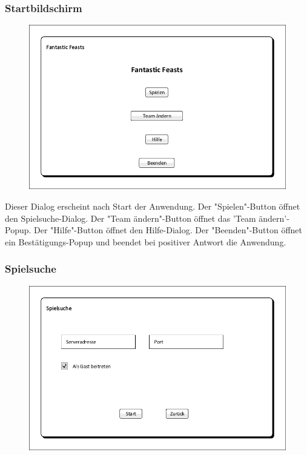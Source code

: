 \subsubsection{Startbildschirm}
\begin{figure}[H]
	\centering
	\includegraphics[scale=0.8]{images/Startbildschirm.pdf}
\end{figure}

Dieser Dialog erscheint nach Start der Anwendung. Der "Spielen"-Button öffnet den Spielsuche-Dialog. Der "Team ändern"-Button öffnet das 'Team ändern'-Popup. Der "Hilfe"-Button öffnet den Hilfe-Dialog. Der "Beenden"-Button öffnet ein Bestätigungs-Popup und beendet bei positiver Antwort die Anwendung.

\subsubsection{Spielsuche}
\begin{figure}[H]
	\centering
	\includegraphics[scale=0.8]{images/Spielsuche.pdf}
\end{figure}


